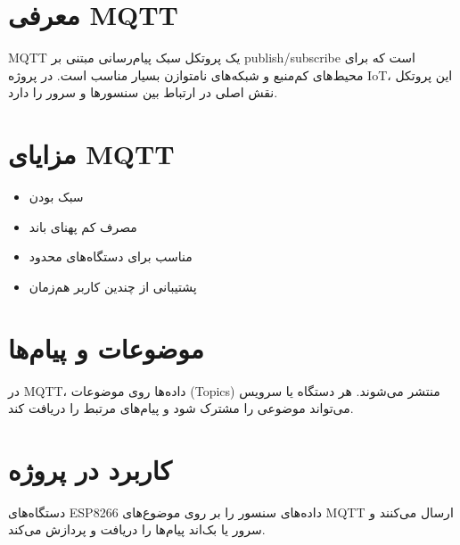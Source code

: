 \section{معرفی MQTT}

MQTT یک پروتکل سبک پیام‌رسانی مبتنی بر publish/subscribe است که برای محیط‌های کم‌منبع و شبکه‌های نامتوازن بسیار مناسب است. در پروژه IoT، این پروتکل نقش اصلی در ارتباط بین سنسورها و سرور را دارد.

\section{مزایای MQTT}

\begin{itemize}
    \item سبک بودن
    \item مصرف کم پهنای باند
    \item مناسب برای دستگاه‌های محدود
    \item پشتیبانی از چندین کاربر هم‌زمان
\end{itemize}

\section{موضوعات و پیام‌ها}

در MQTT، داده‌ها روی موضوعات (Topics) منتشر می‌شوند. هر دستگاه یا سرویس می‌تواند موضوعی را مشترک شود و پیام‌های مرتبط را دریافت کند.

\section{کاربرد در پروژه}

دستگاه‌های ESP8266 داده‌های سنسور را بر روی موضوع‌های MQTT ارسال می‌کنند و سرور یا بک‌اند پیام‌ها را دریافت و پردازش می‌کند.
